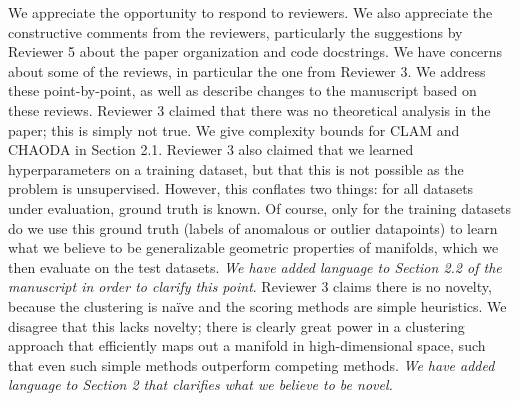 \documentclass{article}
\begin{document}
We appreciate the opportunity to respond to reviewers.
We also appreciate the constructive comments from the reviewers, particularly the suggestions by Reviewer 5 about the paper organization and code docstrings.
We have concerns about some of the reviews, in particular the one from Reviewer 3.
We address these point-by-point, as well as describe changes to the manuscript based on these reviews.
Reviewer 3 claimed that there was no theoretical analysis in the paper; this is simply not true.
We give complexity bounds for CLAM and CHAODA in Section 2.1.
Reviewer 3 also claimed that we learned hyperparameters on a training dataset, but that this is not possible as the problem is unsupervised.
However, this conflates two things: for all datasets under evaluation, ground truth is known.
Of course, only for the training datasets do we use this ground truth (labels of anomalous or outlier datapoints) to learn what we believe to be generalizable geometric properties of manifolds, which we then evaluate on the test datasets.
\emph{We have added language to Section 2.2 of the manuscript in order to clarify this point}.
Reviewer 3 claims there is no novelty, because the clustering is na\"ive and the scoring methods are simple heuristics.
We disagree that this lacks novelty; there is clearly great power in a clustering approach that efficiently maps out a manifold in high-dimensional space, such that even such simple methods outperform competing methods.
\emph{We have added language to Section 2 that clarifies what we believe to be novel.}
\end{document}
